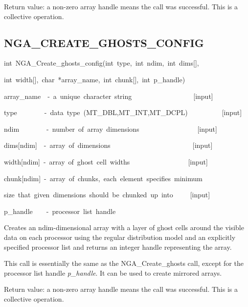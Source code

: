 Return value: a non-zero array handle means the call was successful.
This is a collective operation.


\subsection*{\label{sub:NGA_CREATE_GHOSTS_CONFIG}NGA\_CREATE\_GHOSTS\_CONFIG}
\begin{lyxcode}
int~NGA\_Create\_ghosts\_config(int~type,~int~ndim,~int~dims{[}{]},~

int~width{[}{]},~char~{*}array\_name,~int~chunk{[}{]},~int~p\_handle)



array\_name~~-~a~unique~character~string~~~~~~~~~~~~~~~~~~{[}input{]}~

type~~~~~~~~-~data~type~(MT\_DBL,MT\_INT,MT\_DCPL)~~~~~~~~~~{[}input{]}~

ndim~~~~~~~~-~number~of~array~dimensions~~~~~~~~~~~~~~~~~{[}input{]}~

dims{[}ndim{]}~~-~array~of~dimensions~~~~~~~~~~~~~~~~~~~~~~~~{[}input{]}~

width{[}ndim{]}~-~array~of~ghost~cell~widths~~~~~~~~~~~~~~~~~{[}input{]}~

chunk{[}ndim{]}~-~array~of~chunks,~each~element~specifies~minimum~

size~that~given~dimensions~should~be~chunked~up~into~~~~~{[}input{]}~

p\_handle~~~~-~processor~list~handle
\end{lyxcode}
Creates an ndim-dimensional array with a layer of ghost cells around
the visible data on each processor using the regular distribution
model and an explicitly specified processor list and returns an integer
handle representing the array.

This call is essentially the same as the NGA\_Create\_ghosts call,
except for the processor list handle \emph{p\_handle}. It can be used
to create mirrored arrays.

Return value: a non-zero array handle means the call was successful.
This is a collective operation. 


